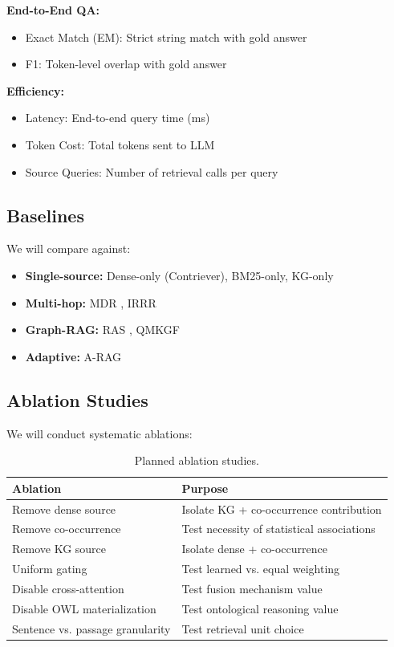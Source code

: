 \documentclass[11pt,a4paper]{article}
\begin{document}
\textbf{End-to-End QA:}
\begin{itemize}
    \item Exact Match (EM): Strict string match with gold answer
    \item F1: Token-level overlap with gold answer
\end{itemize}

\textbf{Efficiency:}
\begin{itemize}
    \item Latency: End-to-end query time (ms)
    \item Token Cost: Total tokens sent to LLM
    \item Source Queries: Number of retrieval calls per query
\end{itemize}

\subsection{Baselines}

We will compare against:
\begin{itemize}
    \item \textbf{Single-source:} Dense-only (Contriever), BM25-only, KG-only
    \item \textbf{Multi-hop:} MDR \citep{xiong2021answering}, IRRR \citep{qi2021answering}
    \item \textbf{Graph-RAG:} RAS \citep{ras2024}, QMKGF \citep{qmkgf2024}
    \item \textbf{Adaptive:} A-RAG \citep{arag2024}
\end{itemize}

\subsection{Ablation Studies}

We will conduct systematic ablations:

\begin{table}[h]
\centering
\small
\begin{tabular}{ll}
\toprule
\textbf{Ablation} & \textbf{Purpose} \\
\midrule
Remove dense source & Isolate KG + co-occurrence contribution \\
Remove co-occurrence & Test necessity of statistical associations \\
Remove KG source & Isolate dense + co-occurrence \\
Uniform gating & Test learned vs. equal weighting \\
Disable cross-attention & Test fusion mechanism value \\
Disable OWL materialization & Test ontological reasoning value \\
Sentence vs. passage granularity & Test retrieval unit choice \\
\bottomrule
\end{tabular}
\caption{Planned ablation studies.}
\label{tab:ablations}
\end{table}
\end{document}
